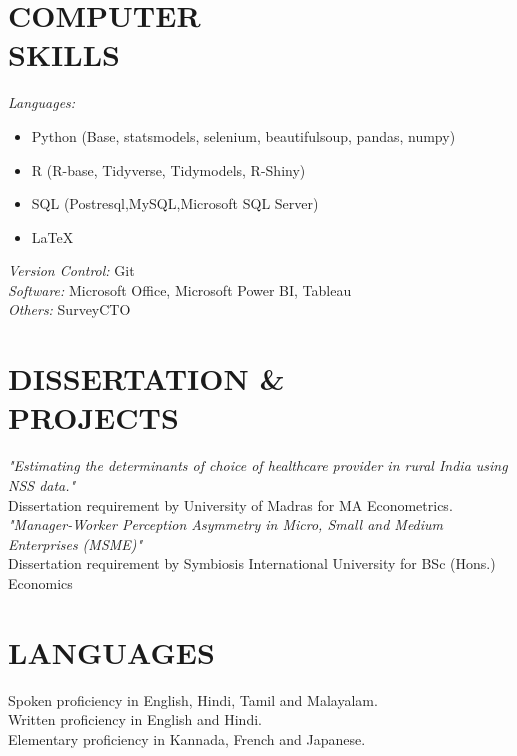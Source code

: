 \documentclass[margin]{res}
\begin{document}
\begin{resume}
\section{COMPUTER \\ SKILLS}
				{\sl Languages:}
				\begin{itemize}
				 \item Python (Base, statsmodels, selenium, beautifulsoup, pandas, numpy)
				 \item R (R-base, Tidyverse, Tidymodels, R-Shiny)
				 \item SQL (Postresql,MySQL,Microsoft SQL Server)
				 \item \LaTeX
				\end{itemize}
				{\sl Version Control:} Git\\
				{\sl Software:} Microsoft Office, Microsoft Power BI, Tableau\\
				{\sl Others:} SurveyCTO\\

\section{DISSERTATION \& \\PROJECTS}
        \emph{"Estimating the determinants of choice of healthcare provider in rural India using NSS data."}\\
				Dissertation requirement by University of Madras for  MA Econometrics. \vspace{2mm} \\
				\emph{"Manager-Worker Perception Asymmetry in Micro, Small and Medium Enterprises (MSME)"}\\
				Dissertation requirement by Symbiosis International University for  BSc (Hons.) Economics \\

\section{LANGUAGES}
Spoken proficiency in English, Hindi, Tamil and Malayalam.\\
Written proficiency in English and Hindi.\\
Elementary proficiency in Kannada, French and Japanese.



\end{resume}
\end{document}
